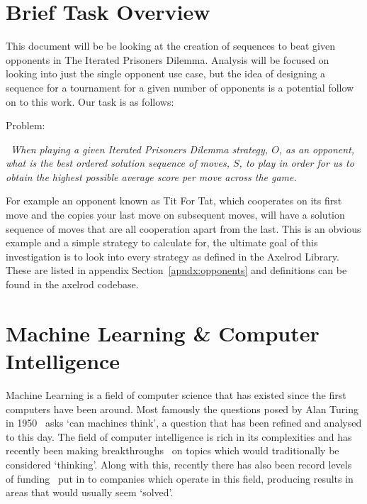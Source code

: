 \section{Brief Task Overview}\label{sec:briefOverview}
This document will be be looking at the creation of sequences to beat given opponents in The Iterated Prisoners Dilemma.
Analysis will be focused on looking into just the single opponent use case, but the idea of designing a sequence for a tournament for a given number of opponents is a potential follow on to this work.
Our task is as follows:

Problem:
\begin{center}
    \itshape~When playing a given Iterated Prisoners Dilemma strategy, \(O\), as an opponent, what is the best ordered solution sequence of moves, \(S\), to play in order for us to obtain the highest possible average score per move across the game.
\end{center}

For example an opponent known as Tit For Tat, which cooperates on its first move and the copies your last move on subsequent moves, will have a solution sequence of moves that are all cooperation apart from the last.
This is an obvious example and a simple strategy to calculate for, the ultimate goal of this investigation is to look into every strategy as defined in the Axelrod Library.
These are listed in appendix Section~\ref{apndx:opponents} and definitions can be found in the axelrod codebase\cite{axelrodproject}.


\section{Machine Learning \& Computer Intelligence}\label{sec:machineLearningAndcomputerIntelligence}
Machine Learning is a field of computer science that has existed since the first computers have been around.
Most famously the questions posed by Alan Turing in 1950~\cite{turing1950computing} asks `can machines think', a question that has been refined and analysed to this day.
The field of computer intelligence is rich in its complexities and has recently been making breakthroughs~\cite{knight2017alphaZeroMIT} on topics which would traditionally be considered `thinking'.
Along with this, recently there has also been record levels of funding~\cite{chui2017artificial} put in to companies which operate in this field, producing results in areas that would usually seem `solved'.

